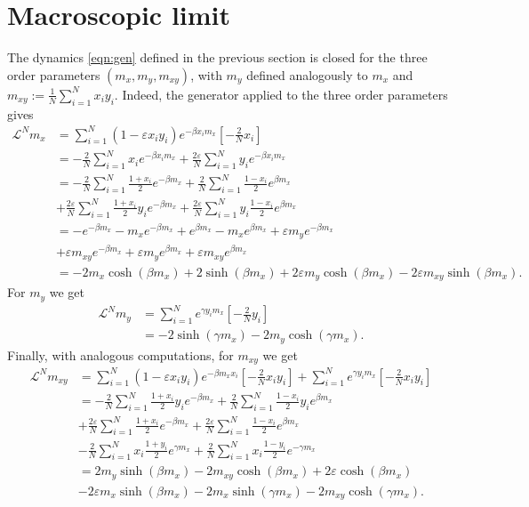 \documentclass[a4paper,10pt,leqno]{amsart}
\theoremstyle{plain}
\begin{document}
\section{Macroscopic limit}
The dynamics \eqref{eqn:gen} defined in the previous section is closed for the three order parameters $(m_x, m_y, m_{xy})$, with $m_y$ defined analogously to $m_x$ and $m_{xy} := \frac{1}{N}\sum_{i=1}^N x_i y_i$. Indeed, the generator applied to the three order parameters gives
\begin{align*}
\mathcal{L}^N m_x & = \sum_{i=1}^N (1-\varepsilon x_i y_i)e^{-\beta x_i m_x}\left[-\frac{2}{N} x_i\right] \\
& = -\frac{2}{N}\sum_{i=1}^N x_i e^{-\beta x_i m_x} + \frac{2\varepsilon}{N}\sum_{i=1}^N y_i e^{-\beta x_i m_x} \\
& = -\frac{2}{N}\sum_{i=1}^N\frac{1+x_i}{2}e^{-\beta m_x} + \frac{2}{N}\sum_{i=1}^N \frac{1-x_i}{2}e^{\beta m_x} \\
& + \frac{2\varepsilon}{N}\sum_{i=1}^N \frac{1+x_i}{2}y_i e^{-\beta m_x} + \frac{2\varepsilon}{N}\sum_{i=1}^N y_i \frac{1-x_i}{2}e^{\beta m_x}\\
& = - e^{-\beta m_x} - m_x e^{-\beta m_x} + e^{\beta m_x} - m_x e^{\beta m_x} + \varepsilon m_y e^{-\beta m_x} \\
& + \varepsilon m_{xy}e^{-\beta m_x} + \varepsilon m_y e^{\beta m_x} + \varepsilon m_{xy} e^{\beta m_x} \\
& = -2 m_{x} \cosh{(\beta m_x)} + 2 \sinh{(\beta m_x)} + 2\varepsilon m_y \cosh{(\beta m_x)} - 2\varepsilon m_{xy}\sinh{(\beta m_x)}.
\end{align*}
For $m_y$ we get
\begin{align*}
\mathcal{L}^N m_y & = \sum_{i=1}^N e^{\gamma y_i m_x} \left[-\frac{2}{N} y_i \right] \\
& = -2\sinh{(\gamma m_x)} - 2 m_y \cosh{(\gamma m_x)}. 
\end{align*}
Finally, with analogous computations, for $m_{xy}$ we get
\begin{align*}
\mathcal{L}^N m_{xy}  &= \sum_{i=1}^N (1-\varepsilon x_i y_i) e^{-\beta m_x x_i}\left[-\frac{2}{N} x_i y_i \right] + \sum_{i=1}^N e^{\gamma y_i m_x}\left[-\frac{2}{N} x_i y_i\right]\\
& = -\frac{2}{N}\sum_{i=1}^N \frac{1+x_i}{2} y_i e^{-\beta m_x} + \frac{2}{N}\sum_{i=1}^N \frac{1-x_i}{2} y_i e^{\beta m_x} \\
& + \frac{2\varepsilon}{N}\sum_{i=1}^N \frac{1+x_i}{2}e^{-\beta m_x} + \frac{2\varepsilon}{N}\sum_{i=1}^N \frac{1-x_i}{2}e^{\beta m_x}\\
& -\frac{2}{N}\sum_{i=1}^N x_i \frac{1+y_i}{2} e^{\gamma m_x} + \frac{2}{N}\sum_{i=1}^N x_i \frac{1-y_i}{2}e^{-\gamma m_x}\\
& = 2 m_y \sinh{(\beta m_x)} - 2 m_{xy} \cosh{(\beta m_x)} + 2\varepsilon \cosh{(\beta m_x)} \\
& - 2\varepsilon m_x \sinh{(\beta m_x)} -2m_x \sinh{(\gamma m_x)} - 2 m_{xy} \cosh{(\gamma m_x)}.
\end{align*}
\end{document}
